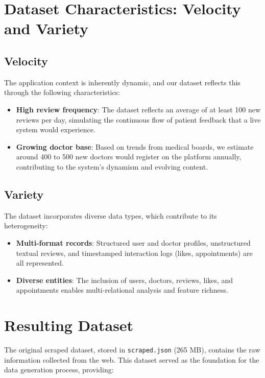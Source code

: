 \section{Dataset Characteristics: Velocity and Variety}

\subsection{Velocity}

The application context is inherently dynamic, and our dataset reflects this through the following characteristics:

\begin{itemize}
    \item \textbf{High review frequency}: The dataset reflects an average of at least 100 new reviews per day, simulating the continuous flow of patient feedback that a live system would experience.
    \item \textbf{Growing doctor base}: Based on trends from medical boards, we estimate around 400 to 500 new doctors would register on the platform annually, contributing to the system’s dynamism and evolving content.
\end{itemize}

\subsection{Variety}

The dataset incorporates diverse data types, which contribute to its heterogeneity:

\begin{itemize}
    \item \textbf{Multi-format records}: Structured user and doctor profiles, unstructured textual reviews, and timestamped interaction logs (likes, appointments) are all represented.
    \item \textbf{Diverse entities}: The inclusion of users, doctors, reviews, likes, and appointments enables multi-relational analysis and feature richness.
\end{itemize}

\section{Resulting Dataset}

The original scraped dataset, stored in \texttt{scraped.json} (265 MB), contains the raw information collected from the web. This dataset served as the foundation for the data generation process, providing:

